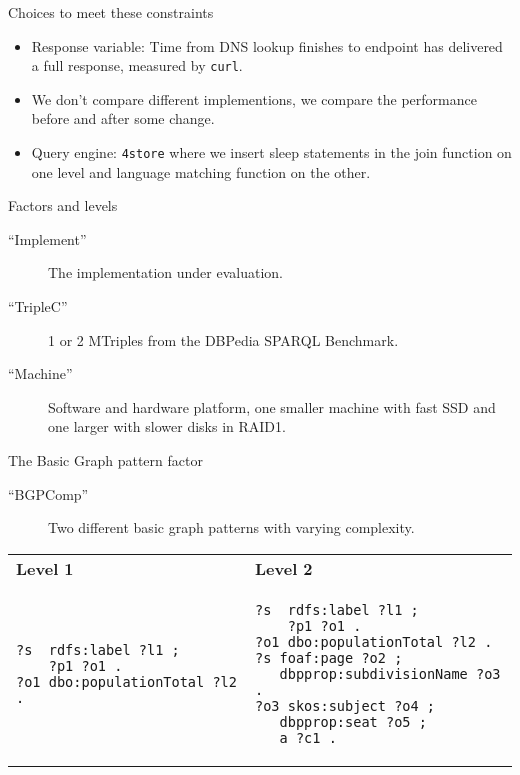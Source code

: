 \documentclass[english,usenames,dvipsnames,aspectratio=169]{beamer}
\begin{document}
\begin{frame}{Choices to meet these constraints}

  \begin{itemize}
  \item Response variable: Time from DNS lookup finishes to endpoint
    has delivered a full response, measured by \texttt{curl}.
  \item We don't compare different implementions, we compare the
    performance before and after some change.
  \item Query engine: \texttt{4store} where we insert \textsf{sleep}
    statements in the join function on one level and language matching
    function on the other. 
  \end{itemize}

\end{frame}


\begin{frame}{Factors and levels}
  \begin{description}
  \item [``Implement''] The implementation under evaluation.
  \item [``TripleC''] 1 or 2 MTriples from the DBPedia SPARQL
    Benchmark.
  \item [``Machine''] Software and hardware platform, one smaller
    machine with fast SSD and one larger with slower disks in RAID1.
  \end{description}
\end{frame}

\begin{frame}[fragile]{The Basic Graph pattern factor}
  \begin{description}

  \item [``BGPComp''] Two different basic graph patterns with varying
    complexity.
  \end{description}

  \begin{center}\small
    \begin{tabular}{|@{~~}p{}|@{~~}p{}|}
      \hline
      \textbf{Level 1} & \textbf{Level 2} \\[-2ex] 
      \begin{verbatim}
?s  rdfs:label ?l1 ;
    ?p1 ?o1 .
?o1 dbo:populationTotal ?l2 .
      \end{verbatim}
      & 
      \begin{verbatim}
?s  rdfs:label ?l1 ;
    ?p1 ?o1 .
?o1 dbo:populationTotal ?l2 .
?s foaf:page ?o2 ;
   dbpprop:subdivisionName ?o3 .
?o3 skos:subject ?o4 ;
   dbpprop:seat ?o5 ;
   a ?c1 .
\end{verbatim} 
\\      \hline
    \end{tabular}
  \end{center}

\end{frame}
\end{document}
